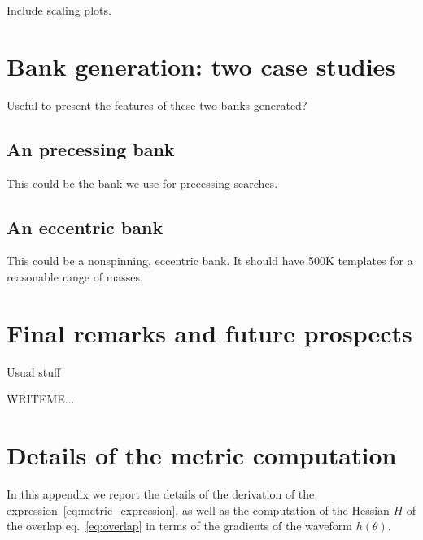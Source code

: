 \documentclass[twocolumn,showpacs,preprintnumbers,nofootinbib,prd,
superscriptaddress,10pt]{revtex4-1}
\begin{document}
Include scaling plots.

\section{Bank generation: two case studies} \label{sec:bank_generation}

Useful to present the features of these two banks generated?

\subsection{An precessing bank}
This could be the bank we use for precessing searches.

\subsection{An eccentric bank}
This could be a nonspinning, eccentric bank. It should have 500K templates for a reasonable range of masses.

\section{Final remarks and future prospects} \label{sec:conclusion}
Usual stuff

        \begin{acknowledgments}
         
          WRITEME...
        \end{acknowledgments}

\appendix
\section{Details of the metric computation}\label{app:metric}

In this appendix we report the details of the derivation of the expression~\eqref{eq:metric_expression}, as well as the computation of the Hessian $H$ of the overlap eq.~\eqref{eq:overlap} in terms of the gradients of the waveform $h(\theta)$. 
\end{document}
